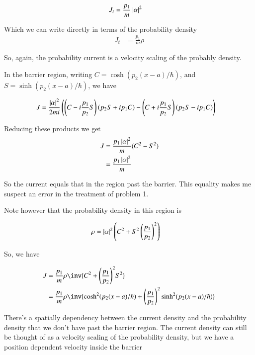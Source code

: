 \begin{align}\label{eqn:qmb_first_try:JtBarrier}
J_t
&= \frac{p_1}{m} \left\lvert{\alpha}\right\rvert^2 
\end{align}

Which we can write directly in terms of the probability density
\begin{align*}
J_t
&= \frac{p_1}{m} \rho
\end{align*}

So, again, the probability current is a velocity scaling of the probably density.

In the barrier region, writing 
$C = \cosh(p_2(x-a)/\hbar)$, and 
$S = \sinh(p_2(x-a)/\hbar)$, we have

\begin{align*}
J &= 
\frac{\left\lvert{\alpha}\right\rvert^2}{ 2 m i } 
\left(
\left(C - i \frac{p_1}{p_2}S\right)
\left(p_2 S + i p_1 C\right) 
-
\left(C + i \frac{p_1}{p_2}S\right)
\left(p_2 S - i p_1 C\right)
\right)
\end{align*}

Reducing these products we get
\begin{align*}
J 
&= 
\frac{p_1 \left\lvert{\alpha}\right\rvert^2}{m} (C^2 - S^2) \\
&= 
\frac{p_1 \left\lvert{\alpha}\right\rvert^2}{m} 
\end{align*}

So the current equals that in the region past the barrier.  This 
equality makes me suspect an error in the treatment of problem 1.

Note however
that the probability density in this region is

\begin{align*}
\rho 
&= \left\lvert{\alpha}\right\rvert^2 \left(
C^2 + S^2 \left(\frac{p_1}{p_2}\right)^2
\right)
\end{align*}

So, we have

\begin{align*}
J 
&= 
\frac{p_1}{m} \rho \inv{C^2 + {\left(\frac{p_1}{p_2}\right)}^2 S^2 } \\
&= 
\frac{p_1}{m} \rho \inv{
\cosh^2(p_2(x-a)/\hbar)
 + 
 {\left(\frac{p_1}{p_2}\right)}^2
\sinh^2(p_2(x-a)/\hbar)
 } \\
\end{align*}

There's a spatially dependency between the current density and the probability density that we don't have past the barrier region.  The current density
can still
be thought of as a velocity scaling of the probability density, but
we have a position dependent velocity inside the barrier

